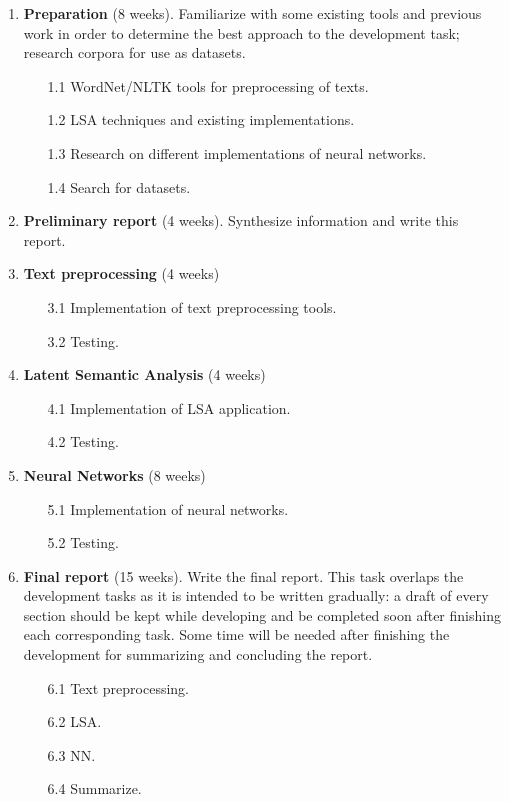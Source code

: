 \documentclass[10pt,a4paper]{report}
\begin{document}
	\begin{enumerate}
		\item \textbf{Preparation} (8 weeks). Familiarize with some existing tools and previous work in order to determine the best approach to the development task; research corpora for use as datasets.
		\begin{enumerate}
			\item[1.1] WordNet/NLTK tools for preprocessing of texts.
			\item[1.2] LSA techniques and existing implementations.
			\item[1.3] Research on different implementations of neural networks.
			\item[1.4] Search for datasets.
		\end{enumerate}
		\item \textbf{Preliminary report} (4 weeks). Synthesize information and write this report.
		\item \textbf{Text preprocessing} (4 weeks)
		\begin{enumerate}
			\item[3.1] Implementation of text preprocessing tools.
			\item[3.2] Testing.
		\end{enumerate}
		\item \textbf{Latent Semantic Analysis} (4 weeks)
		\begin{enumerate}
			\item[4.1] Implementation of LSA application.
			\item[4.2] Testing.
		\end{enumerate}
		\item \textbf{Neural Networks} (8 weeks)
		\begin{enumerate}
			\item[5.1] Implementation of neural networks.
			\item[5.2] Testing.
		\end{enumerate}
		\item \textbf{Final report} (15 weeks). Write the final report. This task overlaps the development tasks as it is intended to be written gradually: a draft of every section should be kept while developing and be completed soon after finishing each corresponding task. Some time will be needed after finishing the development for summarizing and concluding the report.
		\begin{enumerate}
			\item[6.1] Text preprocessing.
			\item[6.2] LSA.
			\item[6.3] NN.
			\item[6.4] Summarize.
		\end{enumerate}
	\end{enumerate}
\end{document}
